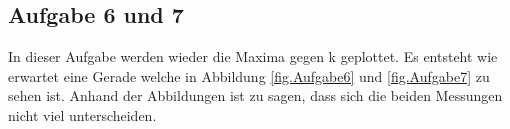 
%


\subsection{Aufgabe 6 und 7}
In dieser Aufgabe werden wieder die Maxima gegen k geplottet. Es entsteht wie erwartet eine Gerade welche in Abbildung \ref{fig.Aufgabe6} und \ref{fig.Aufgabe7} zu sehen ist.
Anhand der Abbildungen ist zu sagen, dass sich die beiden Messungen nicht viel unterscheiden.

